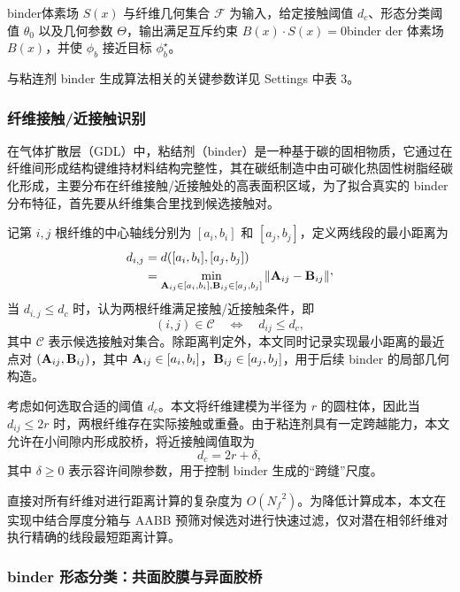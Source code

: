 binder体素场 $S(x)$ 与纤维几何集合 $\mathcal{F}$ 为输入，给定接触阈值 $d_c$、形态分类阈值 $\theta_0$ 以及几何参数 $\Theta$，输出满足互斥约束 $B(x)\cdot S(x)=0$binder der 体素场 $B(x)$，并使 $\phi_b$ 接近目标 $\phi_b^\star$。

与粘连剂 binder 生成算法相关的关键参数详见 Settings 中表 3。

\subsubsection{\textbf{纤维接触/近接触识别}}

在气体扩散层（GDL）中，粘结剂（binder）是一种基于碳的固相物质，它通过在纤维间形成结构键维持材料结构完整性，其在碳纸制造中由可碳化热固性树脂经碳化形成，主要分布在纤维接触/近接触处的高表面积区域，为了拟合真实的 binder 分布特征，首先要从纤维集合里找到候选接触对。

记第 $i,j$ 根纤维的中心轴线分别为 $[a_i,b_i]$ 和 $[a_j,b_j]$，定义两线段的最小距离为
\begin{equation}
\begin{aligned}
d_{i,j} & = d([a_i,b_i],[a_j,b_j]) \\
& = \min_{\textbf A_{ij}\in[a_i,b_i], \textbf B_{ij}\in[a_j,b_j]} \|\textbf A_{ij}-\textbf B_{ij}\|
\end{aligned}
,
\end{equation}
当 $d_{i,j} \le d_c$ 时，认为两根纤维满足接触/近接触条件，即
\begin{equation}
(i,j)\in\mathcal{C} \quad \Longleftrightarrow \quad d_{ij}\le d_c,
\end{equation}
其中 $\mathcal{C}$ 表示候选接触对集合。除距离判定外，本文同时记录实现最小距离的最近点对 $(\textbf A_{ij},\textbf B_{ij})$，其中 $\textbf A_{ij}\in[a_i,b_i]$，$\textbf B_{ij}\in[a_j,b_j]$，用于后续 binder 的局部几何构造。

考虑如何选取合适的阈值 $d_c$。本文将纤维建模为半径为 $r$ 的圆柱体，因此当 $d_{ij} \le 2r$ 时，两根纤维存在实际接触或重叠。由于粘连剂具有一定跨越能力，本文允许在小间隙内形成胶桥，将近接触阈值取为
\begin{equation}
d_c = 2r + \delta,
\end{equation}
其中 $\delta \ge 0$ 表示容许间隙参数，用于控制 binder 生成的“跨缝”尺度。

直接对所有纤维对进行距离计算的复杂度为 $O({N_f}^2)$。为降低计算成本，本文在实现中结合厚度分箱与 AABB 预筛对候选对进行快速过滤，仅对潜在相邻纤维对执行精确的线段最短距离计算。

\subsubsection{\textbf{binder 形态分类：共面胶膜与异面胶桥}}

